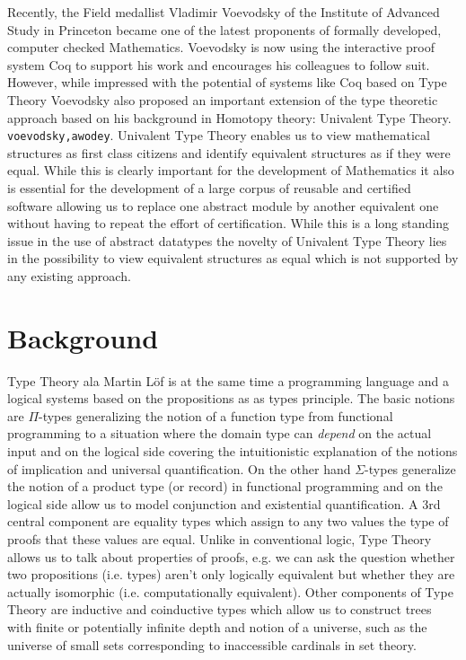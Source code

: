 \documentclass[a4paper]{article}
\renewcommand{\cite}[1]{{\tt #1}}
\begin{document}
Recently, the Field medallist Vladimir Voevodsky of the Institute of
Advanced Study in Princeton became one of the latest proponents of
formally developed, computer checked Mathematics. Voevodsky is now
using the interactive proof system Coq to support his work and
encourages his colleagues to follow suit. However, while impressed
with the potential of systems like Coq based on Type Theory Voevodsky
also proposed an important extension of the type theoretic approach
based on his background in Homotopy theory: Univalent Type Theory.
\cite{voevodsky,awodey}. 
Univalent Type Theory enables us to view mathematical structures as
first class citizens and identify equivalent structures as if they
were equal. While this is clearly important for the development of
Mathematics it also is essential for the development of a large corpus
of reusable and certified software allowing us to replace one abstract
module by another equivalent one without having to repeat the effort
of certification. While this is a long standing issue in the use of
abstract datatypes the novelty of Univalent Type Theory lies in the
possibility to view equivalent structures as equal which is not
supported by any existing approach.


\section{Background}

Type Theory ala Martin L\"of is at the same time a programming
language and a logical systems based on the propositions as as types
principle. The basic notions are $\Pi$-types generalizing the notion
of a function type from functional programming to a situation where
the domain type can \emph{depend} on the actual input and on the
logical side covering the intuitionistic  explanation of the notions of 
implication and universal quantification. On the other hand
$\Sigma$-types generalize the notion of a product type (or record) in
functional programming and on the logical side allow us to model
conjunction and existential quantification. A 3rd central component are
equality types which assign to any two values the type of proofs that 
these values are equal. Unlike in conventional logic, Type Theory
allows us to talk about properties of proofs, e.g. we can ask the
question whether two propositions (i.e. types) aren't only logically
equivalent but whether they are actually isomorphic
(i.e. computationally equivalent). Other components of Type Theory are
inductive and coinductive types which allow us to construct trees
with finite or potentially infinite depth and notion of a universe,
such as the universe of small sets corresponding to inaccessible
cardinals in set theory.
\end{document}
